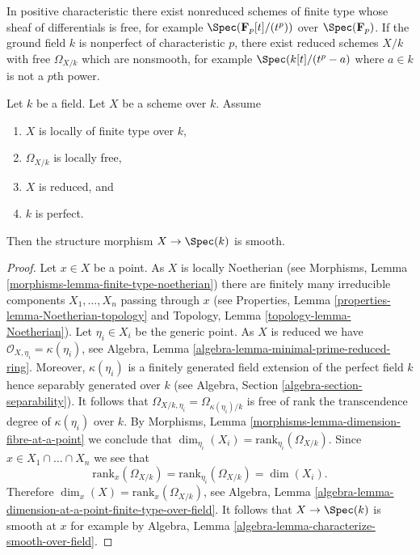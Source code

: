 \noindent
In positive characteristic there exist nonreduced schemes
of finite type whose sheaf of differentials is free, for example
$\Spec(\mathbf{F}_p[t]/(t^p))$ over $\Spec(\mathbf{F}_p)$.
If the ground field $k$ is nonperfect of characteristic $p$,
there exist reduced schemes $X/k$ with free $\Omega_{X/k}$ which are
nonsmooth, for example $\Spec(k[t]/(t^p-a)$ where $a \in k$
is not a $p$th power.

\begin{lemma}
\label{lemma-char-p-differentials-free-smooth}
Let $k$ be a field. Let $X$ be a scheme over $k$.
Assume
\begin{enumerate}
\item $X$ is locally of finite type over $k$,
\item $\Omega_{X/k}$ is locally free,
\item $X$ is reduced, and
\item $k$ is perfect.
\end{enumerate}
Then the structure morphism $X \to \Spec(k)$ is smooth.
\end{lemma}

\begin{proof}
Let $x \in X$ be a point. As $X$ is locally Noetherian (see
Morphisms, Lemma \ref{morphisms-lemma-finite-type-noetherian})
there are finitely many irreducible components
$X_1, \ldots, X_n$ passing through $x$ (see
Properties, Lemma \ref{properties-lemma-Noetherian-topology} and
Topology, Lemma \ref{topology-lemma-Noetherian}).
Let $\eta_i \in X_i$ be the generic point. As $X$ is reduced we have
$\mathcal{O}_{X, \eta_i} = \kappa(\eta_i)$, see
Algebra, Lemma \ref{algebra-lemma-minimal-prime-reduced-ring}.
Moreover, $\kappa(\eta_i)$ is a finitely generated field extension
of the perfect field $k$ hence separably generated over $k$ (see
Algebra, Section \ref{algebra-section-separability}).
It follows that $\Omega_{X/k, \eta_i} = \Omega_{\kappa(\eta_i)/k}$
is free of rank the transcendence degree of $\kappa(\eta_i)$ over $k$. By
Morphisms, Lemma \ref{morphisms-lemma-dimension-fibre-at-a-point}
we conclude that $\dim_{\eta_i}(X_i) = \text{rank}_{\eta_i}(\Omega_{X/k})$.
Since $x \in X_1 \cap \ldots \cap X_n$ we see that
$$
\text{rank}_x(\Omega_{X/k}) = \text{rank}_{\eta_i}(\Omega_{X/k}) = \dim(X_i).
$$
Therefore $\dim_x(X) = \text{rank}_x(\Omega_{X/k})$, see
Algebra, Lemma \ref{algebra-lemma-dimension-at-a-point-finite-type-over-field}.
It follows that $X \to \Spec(k)$ is smooth at $x$ for example by
Algebra, Lemma \ref{algebra-lemma-characterize-smooth-over-field}.
\end{proof}

